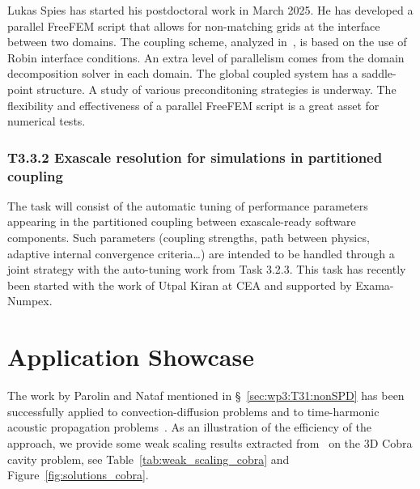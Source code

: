   Lukas Spies has started his postdoctoral work in March 2025. He has developed a parallel FreeFEM script that allows for non-matching grids at the interface between two domains. The coupling scheme, analyzed in~\cite{japhet_robin_2014}, is based on the use of Robin interface conditions. An extra level of parallelism comes from the domain decomposition solver in each domain. The global coupled system has a saddle-point structure. A study of various preconditoning strategies is underway. The flexibility and effectiveness of a parallel FreeFEM script is a great asset for numerical tests. 


\subsubsection{ 
T3.3.2 Exascale resolution for simulations in partitioned coupling
}
 The task will consist of the
automatic tuning of performance parameters appearing in the partitioned coupling between
exascale-ready software components. Such parameters (coupling strengths, path between physics,
adaptive internal convergence criteria…) are intended to be handled through a joint strategy with the
auto-tuning work from Task 3.2.3. This task has recently been started with the work of Utpal Kiran at CEA and supported by Exama-Numpex. 



\section{Application Showcase}
%   
The work by Parolin and Nataf mentioned in \S~\ref{sec:wp3:T31:nonSPD} has been successfully applied to convection-diffusion problems and to time-harmonic acoustic propagation problems~\cite{dolean:hal-05241475}. As an illustration of the efficiency of the approach, we provide some weak scaling results extracted from~\cite{dolean:hal-05241475} on the 3D Cobra cavity problem, see Table~\ref{tab:weak_scaling_cobra} and Figure~\ref{fig:solutions_cobra}. 

